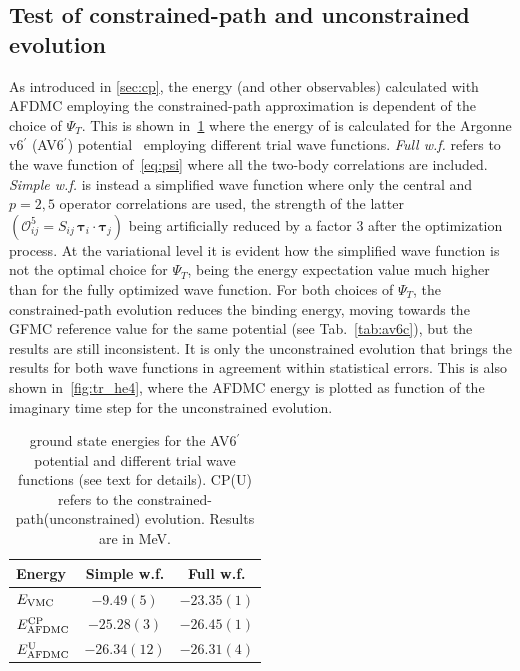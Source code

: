 \documentclass[aps,prc,twocolumn,superscriptaddress,floatfix]{revtex4-1}
\begin{document}
\subsection{Test of constrained-path and unconstrained evolution}
\label{sec:res_cp}
As introduced in \cref{sec:cp}, the energy (and other observables) calculated with AFDMC
employing the constrained-path approximation is dependent of the choice of $\Psi_T$.
This is shown in~\cref{tab:tr} where the energy of  
is calculated for the Argonne v6$^\prime$ (AV6$^\prime$) potential~\cite{Wiringa:2002} 
employing different trial wave functions. 
\textit{Full w.f.} refers to the wave function of~\cref{eq:psi} where all the two-body 
correlations are included.
\textit{Simple w.f.} is instead a simplified wave function where only the central and
$p=2,5$ operator correlations are used, the strength of the latter 
$(\mathcal O_{ij}^5=S_{ij}\,\bm\tau_i\cdot\bm\tau_j)$ being artificially reduced by 
a factor 3 after the optimization process. At the variational level it is evident how
the simplified wave function is not the optimal choice for $\Psi_T$, being the energy
expectation value much higher than for the fully optimized wave function. For both choices
of $\Psi_T$, the constrained-path evolution reduces the binding energy, moving towards the
GFMC reference value for the same potential (see Tab.~\ref{tab:av6c}), but the results are still inconsistent.
It is only the unconstrained evolution that brings the results for both wave functions 
in agreement within statistical errors. This is also shown in~\cref{fig:tr_he4}, where the 
AFDMC energy is plotted as function of the imaginary time step for the unconstrained evolution. 

\setlength{\tabcolsep}{8pt}
\begin{table}[htb]
\centering
\caption[]{ ground state energies for the AV6$^\prime$ potential and different 
trial wave functions (see text for details). 
CP(U) refers to the constrained-path(unconstrained) evolution.
Results are in MeV.}
\begin{tabular}{lcc}
\hline\hline
Energy & Simple w.f. & Full w.f. \\
\hline
$E_{\rm VMC}$            & $-9.49(5)$   & $-23.35(1)$ \\
$E_{\rm AFDMC}^{\rm CP}$ & $-25.28(3)$  & $-26.45(1)$ \\
$E_{\rm AFDMC}^{\rm U}$  & $-26.34(12)$ & $-26.31(4)$ \\
\hline\hline
\end{tabular}
\label{tab:tr}
\end{table}
\setlength{\tabcolsep}{8pt}
\end{document}
